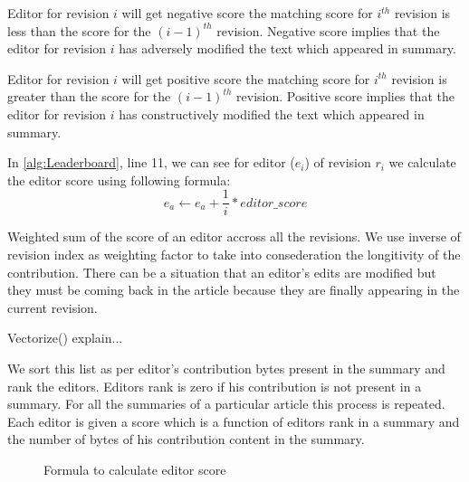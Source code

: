 \documentclass[12pt]{article}
\begin{document}
Editor for revision $i$ will get negative score the matching score for $i^{th}$ revision is less than the score  for the $(i-1)^{th}$ revision.  Negative score implies that the editor for revision $i$ has adversely modified the text which appeared in summary. 

Editor for revision $i$ will get positive score the matching score for $i^{th}$ revision is greater than the score  for the $(i-1)^{th}$ revision. Positive score implies that the editor for revision $i$ has constructively modified the text which appeared in summary. 


In \ref{alg:Leaderboard}, line 11, we can see for editor ($e_i$) of revision $r_i$ we calculate the editor score using following formula:
$$e_a \gets e_a + \frac{1}{i} * editor\_score$$

Weighted sum of the score of an editor accross all the revisions. We use inverse of revision index as weighting factor to take into consederation the longitivity of the contribution. There can be a situation that an editor's edits are modified but they must be coming back in the article because they are finally appearing in the current revision.

Vectorize() explain...

We sort this list as per editor's contribution bytes present in the summary and rank the editors. Editors rank is zero if his contribution is not present in a summary. For all the summaries of a particular article this process is repeated. Each editor is given a score which is a function of editors rank in a summary and the number of bytes of his contribution content in the summary.   



\begin{figure}[!htb]
        \caption{\label{fig:editor_contrib} Formula to calculate editor score}
\end{figure}
\end{document}
